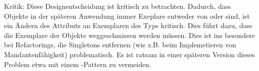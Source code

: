 Kritik:
Diese Designentscheidung ist kritisch zu betrachten. Dadurch, dass Objekte in der späteren Anwendung immer Exeplare entweder von  oder  sind,
ist ein Ändern des Attributs  an Exemplaren des Typs  kritisch. Dies führt dazu, dass die Exemplare der Objekte weggeschmissen werden müssen.
Dies ist ins besondere bei Refactorings, die Singletons entfernen (wie z.B. beim Implemetieren von Mandantenfähigkeit) problematisch.
Es ist ratsam in einer späteren Version dieses Problem etwa mit einem -Pattern zu vermeiden.